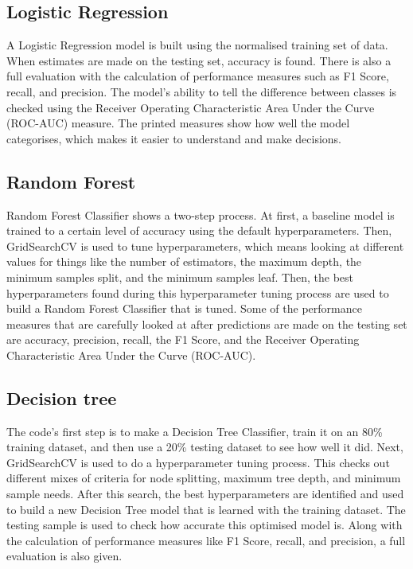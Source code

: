 \subsection{Logistic Regression}
A Logistic Regression model is built using the normalised training set of data. When estimates are made on the testing set, accuracy is found. There is also a full evaluation with the calculation of performance measures such as F1 Score, recall, and precision. The model's ability to tell the difference between classes is checked using the Receiver Operating Characteristic Area Under the Curve (ROC-AUC) measure. The printed measures show how well the model categorises, which makes it easier to understand and make decisions.
\subsection{Random Forest}
Random Forest Classifier shows a two-step process. At first, a baseline model is trained to a certain level of accuracy using the default hyperparameters. Then, GridSearchCV is used to tune hyperparameters, which means looking at different values for things like the number of estimators, the maximum depth, the minimum samples split, and the minimum samples leaf. Then, the best hyperparameters found during this hyperparameter tuning process are used to build a Random Forest Classifier that is tuned. Some of the performance measures that are carefully looked at after predictions are made on the testing set are accuracy, precision, recall, the F1 Score, and the Receiver Operating Characteristic Area Under the Curve (ROC-AUC).
\subsection{Decision tree}
The code's first step is to make a Decision Tree Classifier, train it on an 80\% training dataset, and then use a 20\% testing dataset to see how well it did. Next, GridSearchCV is used to do a hyperparameter tuning process. This checks out different mixes of criteria for node splitting, maximum tree depth, and minimum sample needs. After this search, the best hyperparameters are identified and used to build a new Decision Tree model that is learned with the training dataset. The testing sample is used to check how accurate this optimised model is. Along with the calculation of performance measures like F1 Score, recall, and precision, a full evaluation is also given.

